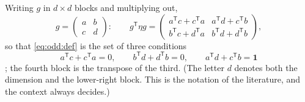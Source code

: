Writing $g$ in $d\times d$ blocks and multiplying out,
\begin{equation}\label{eq:odd:blocks}
 g=\begin{pmatrix}a&b\\c&d\end{pmatrix}:\qquad
 g^{\mathsf T}\eta g=\begin{pmatrix}a^{\mathsf T}c+c^{\mathsf T}a&a^{\mathsf T}d+c^{\mathsf T}b\\
 b^{\mathsf T}c+d^{\mathsf T}a&b^{\mathsf T}d+d^{\mathsf T}b\end{pmatrix},
\end{equation}
so that \eqref{eq:odd:def} is the set of three conditions
\begin{equation}\label{eq:odd:conditions}
 a^{\mathsf T}c+c^{\mathsf T}a=0,\qquad b^{\mathsf T}d+d^{\mathsf T}b=0,\qquad
 a^{\mathsf T}d+c^{\mathsf T}b=\mathbf 1
\end{equation}
; the fourth block is the transpose of the
third. (The letter $d$ denotes both the dimension and the lower-right block. This is the
notation of the literature, and the context always decides.)

